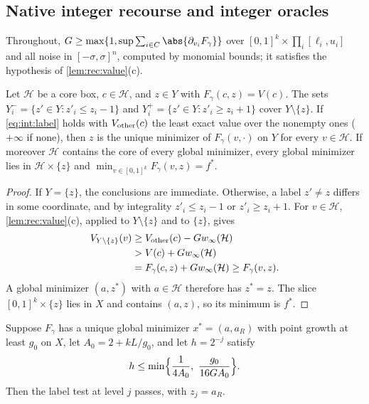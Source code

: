 \subsection{Native integer recourse and integer oracles}\label{app:int:native}

Throughout, $G\ge\max\{1,\sup\sum_{i\in C}\abs{\partial_{v_i}F_\gamma}\}$ over
$[0,1]^k\times\prod_i[\ell_i,u_i]$ and all noise in $[-\sigma,\sigma]^n$, computed
by monomial bounds; it satisfies the hypothesis of \cref{lem:rec:value}(c).

\begin{lemma}\label{lem:int:label}
Let $\mathcal H$ be a core box, $c\in\mathcal H$, and $z\in Y$ with
$F_\gamma(c,z)=V(c)$. The sets $Y_i^-=\{z'\in Y:z'_i\le z_i-1\}$ and
$Y_i^+=\{z'\in Y:z'_i\ge z_i+1\}$ cover $Y\setminus\{z\}$. If
\eqref{eq:int:label} holds with $V_{\rm other}(c)$ the least exact value over
the nonempty ones ($+\infty$ if none), then $z$ is the unique minimizer of
$F_\gamma(v,\cdot)$ on $Y$ for every $v\in\mathcal H$. If moreover $\mathcal H$
contains the core of every global minimizer, every global minimizer lies in
$\mathcal H\times\{z\}$ and $\min_{v\in[0,1]^k}F_\gamma(v,z)=f^*$.
\end{lemma}

\begin{proof}
If $Y=\{z\}$, the conclusions are immediate. Otherwise,
a label $z'\ne z$ differs in some coordinate, and by integrality $z'_i\le z_i-1$
or $z'_i\ge z_i+1$. For $v\in\mathcal H$, \cref{lem:rec:value}(c), applied to
$Y\setminus\{z\}$ and to $\{z\}$, gives
\begin{align*}
 V_{Y\setminus\{z\}}(v)&\ge V_{\rm other}(c)-Gw_\infty(\mathcal H)\\
 &>V(c)+Gw_\infty(\mathcal H)\\
 &=F_\gamma(c,z)+Gw_\infty(\mathcal H)\ge F_\gamma(v,z).
\end{align*}
A global minimizer $(a,z^*)$
with $a\in\mathcal H$ therefore has $z^*=z$. The slice
$[0,1]^k\times\{z\}$ lies in $X$ and contains $(a,z)$, so its minimum is $f^*$.
\end{proof}

\begin{lemma}\label{lem:int:native-stop}
Suppose $F_\gamma$ has a unique global minimizer $x^*=(a,a_R)$ with point growth
at least $g_0$ on $X$, let $A_0=2+kL/g_0$, and let $h=2^{-j}$ satisfy
\[
 h\le\min\Bigl\{\frac1{4A_0},\ \frac{g_0}{16GA_0}\Bigr\}.
\]
Then the label test at level $j$ passes, with $z_j=a_R$.
\end{lemma}

